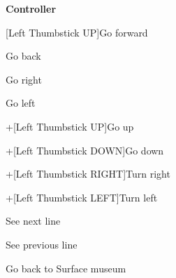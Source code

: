 \documentclass[12pt,dvipdfmx]{article}
\begin{document}
\begin{center}

{\bf \LARGE Controller}

\end{center}

{\Large
[Left Thumbstick UP]\quad Go forward \par 
[Left Thumbstick DOWN]\quad Go back \par 
[Left Thumbstick RIGHT]\quad Go right \par 
[Left Thumbstick LEFT]\quad Go left \par 
[Left Hand Trigger]+[Left Thumbstick UP]\quad Go up \par 
[Left Hand Trigger]+[Left Thumbstick DOWN]\quad Go down \par 
[Left Hand Trigger]+[Left Thumbstick RIGHT]\quad Turn right \par 
[Left Hand Trigger]+[Left Thumbstick LEFT]\quad Turn left \par 
\bigskip\par
[Button A]\quad See next line \par
[Button B]\quad See previous line \par
\bigskip\par
[Left Start]\quad Go back to Surface museum
}
\end{document}
